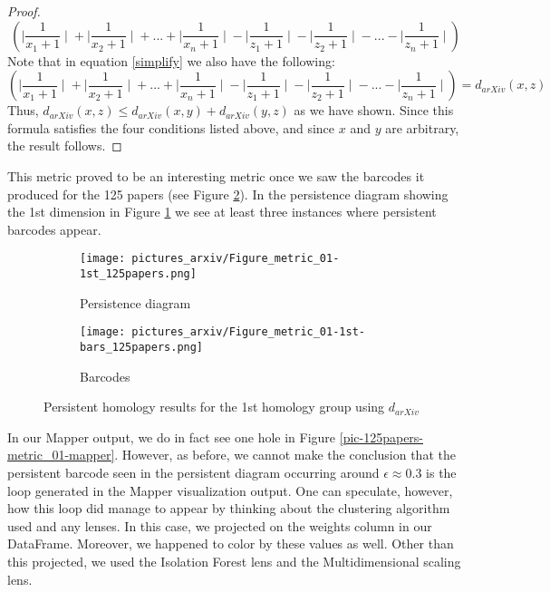 \documentclass[12pt]{article}
\theoremstyle{definition}
\begin{document}
\begin{proof}
\begin{dmath}
		\left({\mid\frac{1}{x_1+1}\mid} + {\mid\frac{1}{x_2+1}\mid} + ... + {\mid\frac{1}{x_n+1}\mid} - {\mid\frac{1}{z_1+1}\mid} - {\mid\frac{1}{z_2+1}\mid} - ... - {\mid\frac{1}{z_n+1}\mid}\right)\label{simplify}
		\end{dmath}	
       Note that in equation \ref{simplify} we also have the following:
		\begin{dmath}
		\left({\mid\frac{1}{x_1+1}\mid} + {\mid\frac{1}{x_2+1}\mid} + ... + {\mid\frac{1}{x_n+1}\mid} - {\mid\frac{1}{z_1+1}\mid} - {\mid\frac{1}{z_2+1}\mid} - ... - {\mid\frac{1}{z_n+1}\mid}\right)
        = d_{arXiv}(x,z)
		\end{dmath} 
		Thus, $d_{arXiv}(x,z)\leq d_{arXiv}(x,y)+d_{arXiv}(y,z)$ as we have shown. Since this formula satisfies the four conditions listed above, and since $x$ and $y$ are arbitrary, the result follows.
	\end{proof}
    
\par This metric proved to be an interesting metric once we saw the barcodes it produced for the 125 papers (see Figure \ref{pic-125papers-metric_01-bars}). In the persistence diagram showing the 1st dimension in Figure \ref{pic-125papers-metric_01} we see at least three instances where persistent barcodes appear.  
\newline

\begin{figure}[h]
\begin{subfigure}{.5\textwidth}
  \centering
  \texttt{[image: pictures\_arxiv/Figure\_metric\_01-1st\_125papers.png]}
  \caption{Persistence diagram}
  \label{pic-125papers-metric_01}
\end{subfigure}
\begin{subfigure}{.5\textwidth}
  \centering
  \texttt{[image: pictures\_arxiv/Figure\_metric\_01-1st-bars\_125papers.png]}
  \caption{Barcodes}
  \label{pic-125papers-metric_01-bars}
\end{subfigure}
\caption{Persistent homology results for the 1st homology group using $d_{arXiv}$}
\label{fig-125papers-metric_01}
\end{figure}

\par In our Mapper output, we do in fact see one hole in Figure \ref{pic-125papers-metric_01-mapper}. However, as before, we cannot make the conclusion that the persistent barcode seen in the persistent diagram occurring around $\epsilon\approx 0.3$ is the loop generated in the Mapper visualization output. One can speculate, however, how this loop did manage to appear by thinking about the clustering algorithm used and any lenses. In this case, we projected on the weights column in our DataFrame. Moreover, we happened to color by these values as well. Other than this projected, we used the Isolation Forest lens and the Multidimensional scaling lens. 
\end{document}
